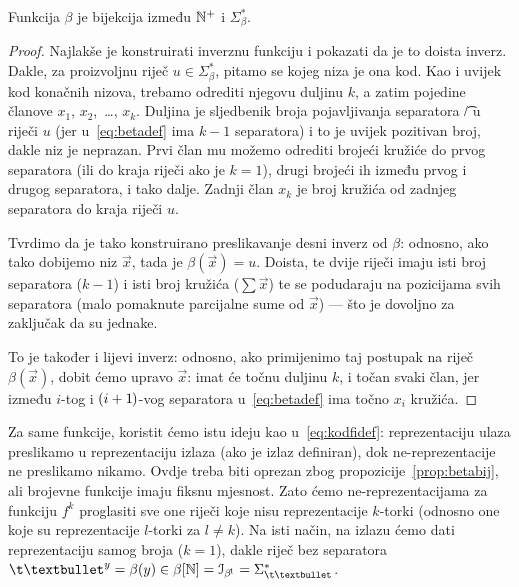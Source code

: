 \begin{propozicija}[{name=[bijektivnost binarne reprezentacije]}]\label{prop:betabij}
Funkcija $\beta$ je bijekcija između ${\mathbb N}^+$ i $\Sigma_\beta^*$.
\end{propozicija}
\begin{proof}
Najlakše je konstruirati inverznu funkciju i pokazati da je to doista inverz. Dakle, za proizvoljnu riječ $u\in\Sigma_\beta^*$, pitamo se kojeg niza je ona kod. Kao i uvijek kod konačnih nizova, trebamo odrediti njegovu duljinu $k$, a zatim pojedine članove $x_1$, $x_2$,~\ldots, $x_k$. Duljina je sljedbenik broja pojavljivanja separatora \t/ u riječi $u$ (jer u~\eqref{eq:betadef} ima $k-1$ separatora) i to je uvijek pozitivan broj, dakle niz je neprazan. Prvi član mu možemo odrediti brojeći kružiće do prvog separatora (ili do kraja riječi ako je $k=1$), drugi brojeći ih između prvog i drugog separatora, i tako dalje. Zadnji član $x_k$ je broj kružića od zadnjeg separatora do kraja riječi $u$.

Tvrdimo da je tako konstruirano preslikavanje desni inverz od $\beta$: odnosno, ako tako dobijemo niz $\vec x$, tada je $\beta(\vec x)=u$. Doista, te dvije riječi imaju isti broj separatora ($k-1$) i isti broj kružića ($\sum\vec x$) te se podudaraju na pozicijama svih separatora (malo pomaknute parcijalne sume od $\vec x$) --- što je dovoljno za zaključak da su jednake.

	To je također i lijevi inverz: odnosno, ako primijenimo taj postupak na riječ $\beta(\vec x)$, dobit ćemo upravo $\vec x$: imat će točnu duljinu $k$, i točan svaki član, jer između $i$-tog i $(i+1\mspace{-1mu})$-vog separatora u~\eqref{eq:betadef} ima točno $x_i$ kružića.
\end{proof}

Za same funkcije, koristit ćemo istu ideju kao u~\eqref{eq:kodfidef}: reprezentaciju ulaza preslikamo u reprezentaciju izlaza (ako je izlaz definiran), dok ne-reprezentacije ne preslikamo nikamo. Ovdje treba biti oprezan zbog propozicije~\ref{prop:betabij}, ali brojevne funkcije imaju fiksnu mjesnost. Zato ćemo ne-reprezentacijama za funkciju $f^k$ proglasiti sve one riječi koje nisu reprezentacije $k$-torki (odnosno one koje su reprezentacije $l$-torki za $l\ne k$). Na isti način, na izlazu ćemo dati reprezentaciju samog broja ($k=1$), dakle riječ bez separatora $\t\textbullet^y=\beta(y)\in\beta[\N]=\im{\beta^{\!1}}=\Sigma_{\t\textbullet}^*$.

